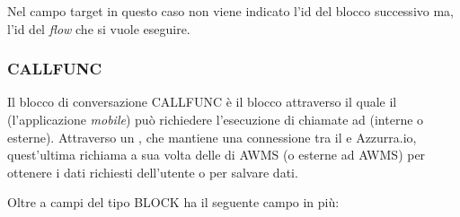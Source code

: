 Nel campo target in questo caso non viene indicato l’id del blocco successivo ma, l’id del \emph{flow} che si vuole eseguire.



\subsubsection{CALLFUNC}

Il blocco di conversazione CALLFUNC è il blocco attraverso il quale il  (l'applicazione \emph{mobile}) può richiedere l’esecuzione di chiamate ad  (interne o esterne). Attraverso un , che mantiene una connessione tra il  e Azzurra.io, quest’ultima richiama a sua volta delle  di \gls{AWMS} (o esterne ad \gls{AWMS}) per ottenere i dati richiesti dell’utente o per salvare dati. 


Oltre a campi del tipo BLOCK ha il seguente campo in più:

